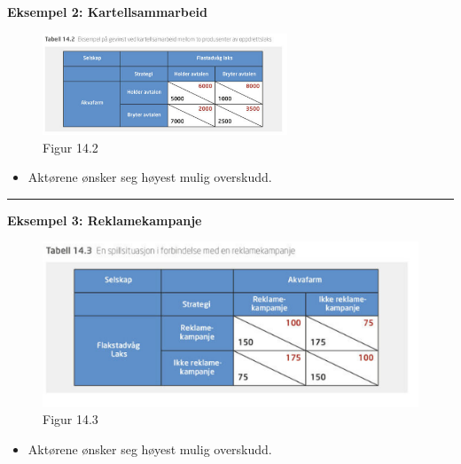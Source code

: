 \documentclass[
  letterpaper,
  DIV=11,
  numbers=noendperiod]{scrartcl}
\providecommand{\tightlist}{%
  \setlength{\itemsep}{0pt}\setlength{\parskip}{0pt}}\usepackage{longtable,booktabs,array}
\begin{document}
\textbf{Eksempel 2: Kartellsammarbeid}

\begin{figure}[H]

{\centering \includegraphics[width=0.65\textwidth,height=\textheight]{drawio/tabell_14.2.png}

}

\caption{Figur 14.2}

\end{figure}%

\begin{itemize}
\tightlist
\item
  Aktørene ønsker seg høyest mulig overskudd.
\end{itemize}

\begin{center}\rule{0.5\linewidth}{0.5pt}\end{center}

\textbf{Eksempel 3: Reklamekampanje}

\begin{figure}[H]

{\centering \includegraphics[width=1\textwidth,height=\textheight]{drawio/tabell_14.3.png}

}

\caption{Figur 14.3}

\end{figure}%

\begin{itemize}
\tightlist
\item
  Aktørene ønsker seg høyest mulig overskudd.
\end{itemize}
\end{document}
